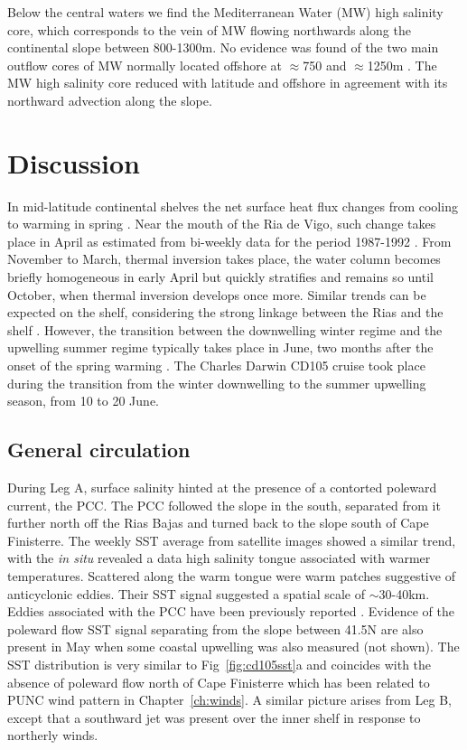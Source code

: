 Below the central waters we find the Mediterranean Water (MW) high
salinity core, which corresponds to the vein of MW flowing
northwards along the continental slope between 800-1300m. No
evidence was found of the two main outflow cores of MW normally
located offshore at $\approx$750 and $\approx$1250m
\citep{Zenk90}. The MW high salinity core reduced with latitude
and offshore in agreement with its northward advection along the
slope.

\section{Discussion}
In mid-latitude continental shelves the net surface heat flux
changes from cooling to warming in spring \citep{He02}. Near the
mouth of the Ria de Vigo, such change takes place in April as
estimated from bi-weekly data for the period 1987-1992
\citep{Nogueira97}. From November to March, thermal inversion
takes place, the water column becomes briefly homogeneous in early
April but quickly stratifies and remains so until October, when
thermal inversion develops once more. Similar trends can be
expected on the shelf, considering the strong linkage between the
Rias and the shelf \citep{Alvarez-Salgado00}. However, the
transition between the downwelling winter regime and the upwelling
summer regime typically takes place in June, two months after the
onset of the spring warming \citep{Nykjaer94}. The Charles Darwin
CD105 cruise took place during the transition from the winter
downwelling to the summer upwelling season, from 10 to 20 June.

\subsection{General circulation}
During Leg A, surface salinity hinted at the presence of a
contorted poleward current, the PCC. The PCC followed the slope in
the south, separated from it further north off the Rias Bajas and
turned back to the slope south of Cape Finisterre. The weekly SST
average from satellite images showed a similar trend, with the
\emph{in situ} revealed a data high salinity tongue associated
with warmer temperatures. Scattered along the warm tongue were
warm patches suggestive of anticyclonic eddies. Their SST signal
suggested a spatial scale of $\sim$30-40km. Eddies associated with
the PCC have been previously reported \citep{Haynes91,Sena96}.
Evidence of the poleward flow SST signal separating from the slope
between 41.5\deg N are also present in May when some
coastal upwelling was also measured (not shown). The SST
distribution is very similar to Fig~\ref{fig:cd105sst}a and
coincides with the absence of poleward flow north of Cape
Finisterre which has been related to PUNC wind pattern in
Chapter~\ref{ch:winds}. A similar picture arises from Leg B,
except that a southward jet was present over the inner shelf in
response to northerly winds.

